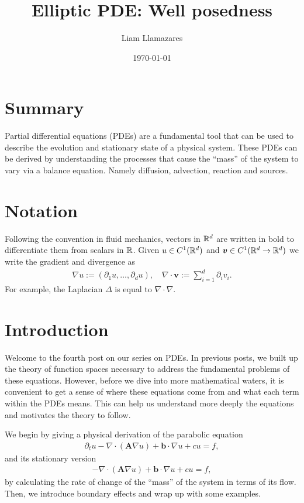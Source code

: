 \documentclass[
	a4paper,
	DIV=14,
	abstract=true,
	numbers=noenddot
]
{scrartcl}
\theoremstyle{definition}
\begin{document}
\title{Elliptic PDE: Well posedness}
\author{Liam Llamazares}
\date{\today}
\maketitle
\section{ Summary}
Partial differential equations (PDEs) are a fundamental tool that can be used to describe the evolution and stationary state of a physical system. These PDEs can be derived by understanding the processes that cause the ``mass'' of the system to vary via a balance equation. Namely diffusion, advection, reaction and sources.

\section{Notation}
Following the convention in fluid mechanics,  vectors in $\mathbb{R}^d$ are written in bold to differentiate them from scalars in $\mathbb{R}$. Given $u \in C^1(\mathbb{R}^d)$ and $\bm{v} \in C^1(\mathbb{R}^d \to \mathbb{R}^d)$ we write the gradient and divergence as
\begin{align*}
	\nabla u :=(\partial _1 u,\ldots, \partial _d u), \quad \nabla \cdot \bm{v}:= \sum_{i=1}^{d} \partial _i v_i.
\end{align*}
For example, the Laplacian $\Delta $ is equal to $\nabla \cdot \nabla $.

\section{Introduction}
Welcome to the fourth post on our series on PDEs. In previous posts, we built up the theory of function spaces necessary to address the fundamental problems of these equations. However, before we dive into more mathematical waters, it is convenient to get a sense of where these equations come from and what each term within the PDEs means. This can help us understand more deeply the equations and motivates the theory to follow.

We begin by giving a physical derivation of the parabolic equation
\begin{align}\label{PDE}
	\partial_t u-\nabla \cdot (\bm{A}\nabla u) +\bm{b} \cdot \nabla u + cu = f,\end{align}
and its stationary version
\begin{align*}
	-\nabla \cdot (\bm{A}\nabla u) +\bm{b} \cdot \nabla u + cu =f,
\end{align*}
by calculating the rate of change of the ``mass'' of the system in terms of its flow. Then, we introduce boundary effects and wrap up with some examples.
\end{document}
